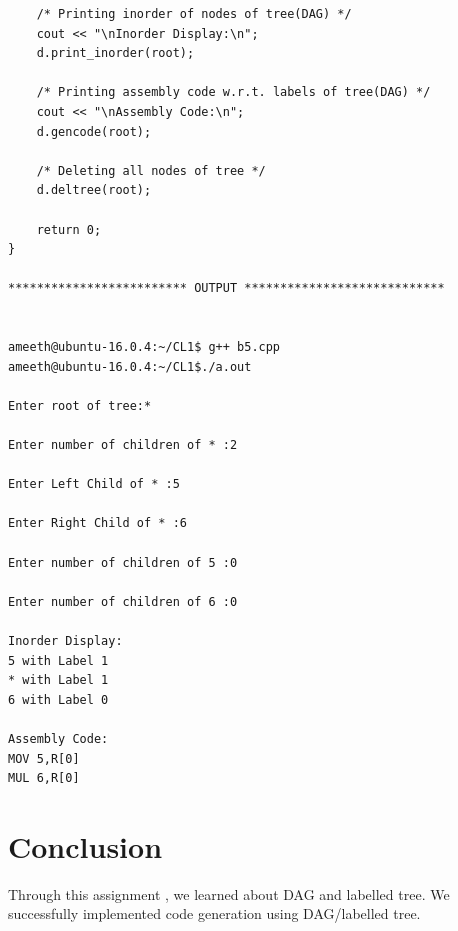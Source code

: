\documentclass[12pt]{article}
\begin{document}
\begin{verbatim}
    /* Printing inorder of nodes of tree(DAG) */
    cout << "\nInorder Display:\n";
    d.print_inorder(root);
    
    /* Printing assembly code w.r.t. labels of tree(DAG) */
    cout << "\nAssembly Code:\n";
    d.gencode(root);
       
    /* Deleting all nodes of tree */
    d.deltree(root);

    return 0;
}

************************* OUTPUT ****************************


ameeth@ubuntu-16.0.4:~/CL1$ g++ b5.cpp 
ameeth@ubuntu-16.0.4:~/CL1$./a.out 

Enter root of tree:*

Enter number of children of * :2

Enter Left Child of * :5

Enter Right Child of * :6

Enter number of children of 5 :0

Enter number of children of 6 :0

Inorder Display:
5 with Label 1
* with Label 1
6 with Label 0

Assembly Code:
MOV 5,R[0]
MUL 6,R[0]

\end{verbatim}
\section{Conclusion}
Through this assignment , we learned about DAG and labelled tree. We successfully
implemented code generation using DAG/labelled tree.
\end{document}
